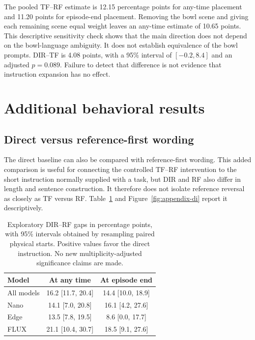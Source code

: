 \documentclass{article}
\begin{document}
The pooled TF--RF estimate is 12.15 percentage points for any-time placement and 11.20 points for episode-end placement. Removing the bowl scene and giving each remaining scene equal weight leaves an any-time estimate of 10.65 points. This descriptive sensitivity check shows that the main direction does not depend on the bowl-language ambiguity. It does not establish equivalence of the bowl prompts. DIR--TF is 4.08 points, with a 95\% interval of $[-0.2,8.4]$ and an adjusted $p=0.089$. Failure to detect that difference is not evidence that instruction expansion has no effect.

\section{Additional behavioral results}
\label{app:behavior-results}
\subsection{Direct versus reference-first wording}
The direct baseline can also be compared with reference-first wording. This added comparison is useful for connecting the controlled TF--RF intervention to the short instruction normally supplied with a task, but DIR and RF also differ in length and sentence construction. It therefore does not isolate reference reversal as closely as TF versus RF. Table~\ref{tab:appendix-di} and Figure~\ref{fig:appendix-di} report it descriptively.
\begin{table}[htbp]
\centering\small
\caption{Exploratory DIR--RF gaps in percentage points, with 95\% intervals obtained by resampling paired physical starts. Positive values favor the direct instruction. No new multiplicity-adjusted significance claims are made.}
\label{tab:appendix-di}
\begin{tabular}{@{}lcc@{}}\toprule Model & At any time & At episode end\\\midrule

All models & 16.2 [11.7, 20.4] & 14.4 [10.0, 18.9]\\

Nano & 14.1 [7.0, 20.8] & 16.1 [4.2, 27.6]\\

Edge & 13.5 [7.8, 19.5] & 8.6 [0.0, 17.7]\\

FLUX & 21.1 [10.4, 30.7] & 18.5 [9.1, 27.6]\\

\bottomrule\end{tabular}\end{table}
\end{document}
